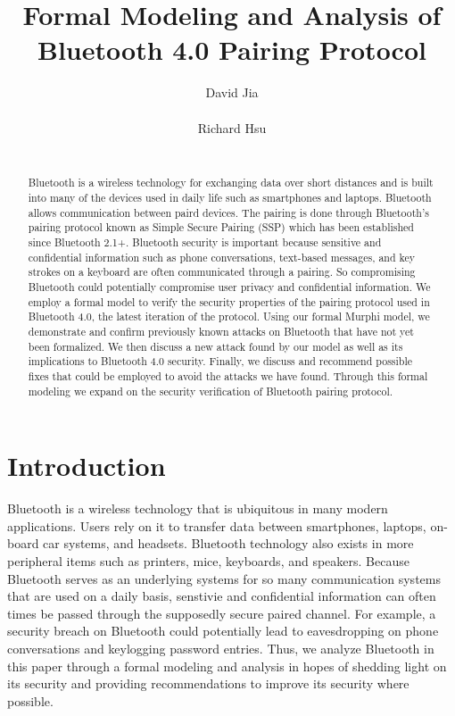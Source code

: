 \documentclass{acm_proc_article-sp}
\begin{document}
\title{Formal Modeling and Analysis of \\ Bluetooth 4.0 Pairing Protocol}
\author{
    \alignauthor David Jia \\
		 \\
	\alignauthor Richard Hsu \\
	     \\
}

\maketitle

\begin{abstract}
Bluetooth is a wireless technology for exchanging data over short distances and is built into many of the devices used in daily life such as smartphones and laptops. Bluetooth allows communication between paird devices. The pairing is done through Bluetooth's pairing protocol known as Simple Secure Pairing (SSP) which has been established since Bluetooth 2.1+. Bluetooth security is important because sensitive and confidential information such as phone conversations, text-based messages, and key strokes on a keyboard are often communicated through a pairing. So compromising Bluetooth could potentially compromise user privacy and confidential information. We employ a formal model to verify the security properties of the pairing protocol used in Bluetooth 4.0, the latest iteration of the protocol. Using our formal Murphi model, we demonstrate and confirm previously known attacks on Bluetooth that have not yet been formalized. We then discuss a new attack found by our model as well as its implications to Bluetooth 4.0 security. Finally, we discuss and recommend possible fixes that could be employed to avoid the attacks we have found. Through this formal modeling we expand on the security verification of Bluetooth pairing protocol.
\end{abstract}


\section{Introduction}

Bluetooth is a wireless technology that is ubiquitous in many modern applications. Users rely on it to transfer data between smartphones, laptops, on-board car systems, and headsets. Bluetooth technology also exists in more peripheral items such as printers, mice, keyboards, and speakers. Because Bluetooth serves as an underlying systems for so many communication systems that are used on a daily basis, senstivie and confidential information can often times be passed through the supposedly secure paired channel. For example, a security breach on Bluetooth could potentially lead to eavesdropping on phone conversations and keylogging password entries. Thus, we analyze Bluetooth in this paper through a formal modeling and analysis in hopes of shedding light on its security and providing recommendations to improve its security where possible.
\end{document}
